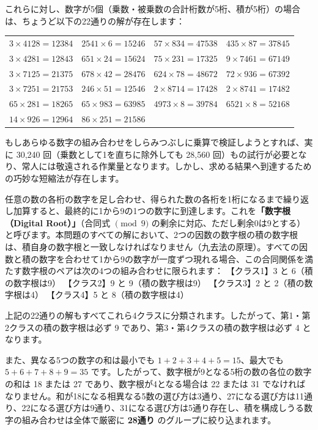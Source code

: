 \documentclass[10pt,a4paper,oneside,openany]{ltjsbook}
\begin{document}
\begin{tcolorbox}[colback=softblue,colframe=primaryblue,title=\textbf{第 85 問：辻馬車の番号（全桁数字の最大積） （原題: THE CAB NUMBERS.）},arc=2mm,boxrule=1pt,breakable]
これらに対し、数字が5個（乗数・被乗数の合計桁数が5桁、積が5桁）の場合は、ちょうど以下の22通りの解が存在します：
\begin{center}
\small
\begin{tabular}{r@{\quad}r@{\quad}r@{\quad}r}
$3 \times 4128 = 12384$ & $2541 \times 6 = 15246$ & $57 \times 834 = 47538$ & $435 \times 87 = 37845$ \\
$3 \times 4281 = 12843$ & $651 \times 24 = 15624$ & $75 \times 231 = 17325$ & $9 \times 7461 = 67149$ \\
$3 \times 7125 = 21375$ & $678 \times 42 = 28476$ & $624 \times 78 = 48672$ & $72 \times 936 = 67392$ \\
$3 \times 7251 = 21753$ & $246 \times 51 = 12546$ & $2 \times 8714 = 17428$ & $2 \times 8741 = 17482$ \\
$65 \times 281 = 18265$ & $65 \times 983 = 63985$ & $4973 \times 8 = 39784$ & $6521 \times 8 = 52168$ \\
$14 \times 926 = 12964$ & $86 \times 251 = 21586$ & & \\
\end{tabular}
\end{center}

もしあらゆる数字の組み合わせをしらみつぶしに乗算で検証しようとすれば、実に 30,240 回（乗数として1を直ちに除外しても 28,560 回）もの試行が必要となり、常人には敬遠される作業量となります。しかし、求める結果へ到達するための巧妙な短縮法が存在します。

任意の数の各桁の数字を足し合わせ、得られた数の各桁を1桁になるまで繰り返し加算すると、最終的に1から9の1つの数字に到達します。これを\textbf{「数字根（Digital Root）」}（合同式 $\pmod 9$ の剰余に対応、ただし剰余0は9とする）と呼びます。本問題のすべての解において、2つの因数の数字根の積の数字根は、積自身の数字根と一致しなければなりません（九去法の原理）。すべての因数と積の数字を合わせて1から9の数字が一度ずつ現れる場合、この合同関係を満たす数字根のペアは次の4つの組み合わせに限られます：
【クラス1】3 と 6（積の数字根は9）
【クラス2】9 と 9（積の数字根は9）
【クラス3】2 と 2（積の数字根は4）
【クラス4】5 と 8（積の数字根は4）

上記の22通りの解もすべてこれら4クラスに分類されます。したがって、第1・第2クラスの積の数字根は必ず 9 であり、第3・第4クラスの積の数字根は必ず 4 となります。

また、異なる5つの数字の和は最小でも $1+2+3+4+5=15$、最大でも $5+6+7+8+9=35$ です。したがって、数字根が9となる5桁の数の各位の数字の和は 18 または 27 であり、数字根が4となる場合は 22 または 31 でなければなりません。和が18になる相異なる5数の選び方は3通り、27になる選び方は11通り、22になる選び方は9通り、31になる選び方は5通り存在し、積を構成しうる数字の組み合わせは全体で厳密に \textbf{28通り} のグループに絞り込まれます。


\end{tcolorbox}
\end{document}
